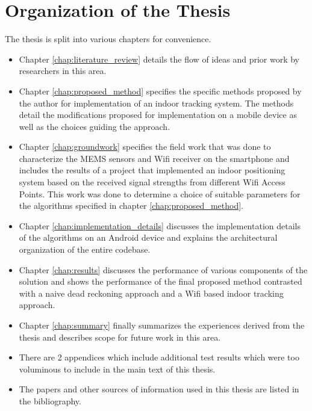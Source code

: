 \section{Organization of the Thesis}

The thesis is split into various chapters for convenience.

\begin{itemize}
\item Chapter \ref{chap:literature_review} details the flow of ideas and prior
work by researchers in this area.

\item Chapter \ref{chap:proposed_method} specifies the specific methods proposed
by the author for implementation of an indoor tracking system. The methods
detail the modifications proposed for implementation on a mobile device as well
as the choices guiding the approach.

\item Chapter \ref{chap:groundwork} specifies the field work that was done to
characterize the MEMS sensors and Wifi receiver on the smartphone and includes
the results of a project that implemented an indoor positioning system based on
the received signal strengths from different Wifi Access Points. This work was
done to determine a choice of suitable parameters for the algorithms specified
in chapter \ref{chap:proposed_method}.

\item Chapter \ref{chap:implementation_details} discusses the implementation
details of the algorithms on an Android device and explains the architectural
organization of the entire codebase.

\item Chapter \ref{chap:results} discusses the performance of various components
of the solution and shows the performance of the final proposed method
contrasted with a naive dead reckoning approach and a Wifi based indoor tracking
approach.

\item Chapter \ref{chap:summary} finally summarizes the experiences derived from
the thesis and describes scope for future work in this area.

\item There are 2 appendices which include additional test results which were
too voluminous to include in the main text of this thesis. 

\item The papers and other sources of information used in this thesis are listed
in the bibliography.
\end{itemize}
